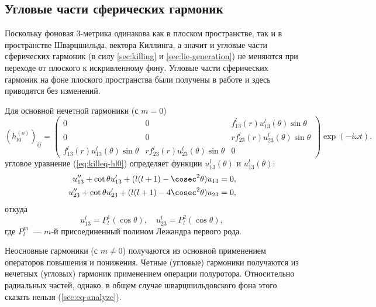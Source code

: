 \documentclass[\docroot/reports/draft/report.tex]{subfiles}
\begin{document}
\subsection{Угловые части сферических гармоник}

    Поскольку фоновая 3-метрика одинакова как в плоском пространстве, так и в пространстве Шварцшильда, вектора Киллинга, а значит и угловые части сферических гармоник (в силу \autoref{sec:killing} и \autoref{sec:lie-generation}) не меняются при переходе от плоского к искривленному фону. Угловые части сферических гармоник на фоне плоского пространства были получены в работе \cite{Vas2018b} и здесь приводятся без изменений.

    Для основной нечетной гармоники (с $m = 0$)
    \begin{equation}\label{eq:hl0e}
        (h_{l0}^{(o)})_{ij} = \begin{pmatrix}
            0&0&f^l_{13}(r)u^l_{13}(\theta)\sin\theta\\
            0&0&r f^l_{23}(r)u^l_{23}(\theta)\sin\theta\\
            f^l_{13}(r)u^l_{13}(\theta)\sin\theta &
                r f^l_{23}(r)u^l_{23}(\theta)\sin\theta & 0
        \end{pmatrix} \exp(-i \omega t).
    \end{equation}
    угловое уравнение (\ref{eq:killeq-hl0}) определяет функции $u^l_{13}(\theta)$ и $u^l_{13}(\theta)$:
    \begin{equation*}\begin{aligned}
        u''_{13} + \cot\theta u'_{13} + (l(l+1) - \cosec^2\theta) u_{13} &= 0, \\
        u''_{23} + \cot\theta u'_{23} + (l(l+1) - 4 \cosec^2\theta) u_{23} &= 0,
    \end{aligned}\end{equation*}
    откуда
    \begin{equation}\label{hl0o-u}
        u^l_{13} = P_l^1(\cos\theta), \quad u^l_{23} = P_l^2(\cos\theta),
    \end{equation}
    где $P_l^m$~--- $m$-й присоединенный полином Лежандра первого рода.

    Неосновные гармоники (с $m \neq 0$) получаются из основной применением операторов повышения и понижения. Четные (угловые) гармоники получаются из нечетных (угловых) гармоник применением операции полуротора. Относительно радиальных частей, однако, в общем случае шварцшильдовского фона этого сказать нельзя (\autoref{sec:eq-analyze}).
\end{document}
